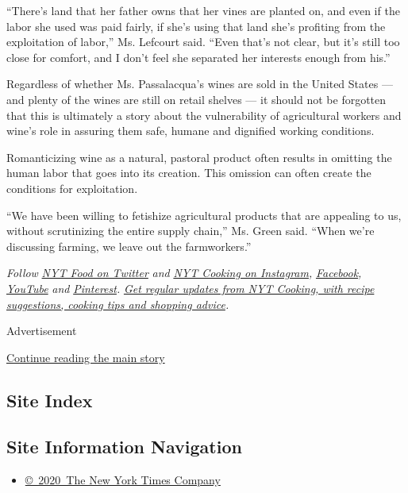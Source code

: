 ``There's land that her father owns that her vines are planted on, and
even if the labor she used was paid fairly, if she's using that land
she's profiting from the exploitation of labor,'' Ms. Lefcourt said.
``Even that's not clear, but it's still too close for comfort, and I
don't feel she separated her interests enough from his.''

Regardless of whether Ms. Passalacqua's wines are sold in the United
States --- and plenty of the wines are still on retail shelves --- it
should not be forgotten that this is ultimately a story about the
vulnerability of agricultural workers and wine's role in assuring them
safe, humane and dignified working conditions.

Romanticizing wine as a natural, pastoral product often results in
omitting the human labor that goes into its creation. This omission can
often create the conditions for exploitation.

``We have been willing to fetishize agricultural products that are
appealing to us, without scrutinizing the entire supply chain,'' Ms.
Green said. ``When we're discussing farming, we leave out the
farmworkers.''

\emph{Follow} \href{https://twitter.com/nytfood}{\emph{NYT Food on
Twitter}} \emph{and}
\href{https://www.instagram.com/nytcooking/}{\emph{NYT Cooking on
Instagram}}\emph{,}
\href{https://www.facebookcorewwwi.onion/nytcooking/}{\emph{Facebook}}\emph{,}
\href{https://www.youtube.com/nytcooking}{\emph{YouTube}} \emph{and}
\href{https://www.pinterest.com/nytcooking/}{\emph{Pinterest}}\emph{.}
\href{https://www.nytimes3xbfgragh.onion/newsletters/cooking}{\emph{Get
regular updates from NYT Cooking, with recipe suggestions, cooking tips
and shopping advice}}\emph{.}

Advertisement

\protect\hyperlink{after-bottom}{Continue reading the main story}

\hypertarget{site-index}{%
\subsection{Site Index}\label{site-index}}

\hypertarget{site-information-navigation}{%
\subsection{Site Information
Navigation}\label{site-information-navigation}}

\begin{itemize}
\tightlist
\item
  \href{https://help.nytimes3xbfgragh.onion/hc/en-us/articles/115014792127-Copyright-notice}{©~2020~The
  New York Times Company}
\end{itemize}


